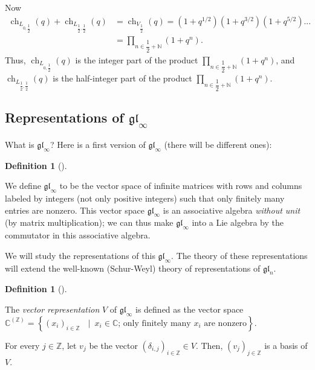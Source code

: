 \documentclass
[numbers=enddot,12pt,final,onecolumn,german,notitlepage]{scrartcl}%
\theoremstyle{definition}
\newtheorem{defi}[theo]{Definition}
\newenvironment{definition}[1][]
{\begin{defi}[#1]\begin{leftbar}}
{\end{leftbar}\end{defi}}
\begin{document}
Now%
\begin{align*}
\operatorname*{ch}\nolimits_{L_{0,\dfrac{1}{2}}}\left(  q\right)
+\operatorname*{ch}\nolimits_{L_{\dfrac{1}{2},\dfrac{1}{2}}}\left(  q\right)
&  =\operatorname*{ch}\nolimits_{V_{\dfrac{1}{2}}}\left(  q\right)  =\left(
1+q^{1/2}\right)  \left(  1+q^{3/2}\right)  \left(  1+q^{5/2}\right)  ...\\
&  =\prod\limits_{n\in\dfrac{1}{2}+\mathbb{N}}\left(  1+q^{n}\right)  .
\end{align*}
Thus, $\operatorname*{ch}\nolimits_{L_{0,\dfrac{1}{2}}}\left(  q\right)  $ is
the integer part of the product $\prod\limits_{n\in\dfrac{1}{2}+\mathbb{N}%
}\left(  1+q^{n}\right)  $, and $\operatorname*{ch}\nolimits_{L_{\dfrac{1}%
{2},\dfrac{1}{2}}}\left(  q\right)  $ is the half-integer part of the product
$\prod\limits_{n\in\dfrac{1}{2}+\mathbb{N}}\left(  1+q^{n}\right)  $.

\subsection{Representations of $\mathfrak{gl}_{\infty}$}

What is $\mathfrak{gl}_{\infty}$? Here is a first version of $\mathfrak{gl}%
_{\infty}$ (there will be different ones):

\begin{definition}
We define $\mathfrak{gl}_{\infty}$ to be the vector space of infinite matrices
with rows and columns labeled by integers (not only positive integers) such
that only finitely many entries are nonzero. This vector space $\mathfrak{gl}%
_{\infty}$ is an associative algebra \textit{without unit} (by matrix
multiplication); we can thus make $\mathfrak{gl}_{\infty}$ into a Lie algebra
by the commutator in this associative algebra.
\end{definition}

We will study the representations of this $\mathfrak{gl}_{\infty}$. The theory
of these representations will extend the well-known (Schur-Weyl) theory of
representations of $\mathfrak{gl}_{n}$.

\begin{definition}
The \textit{vector representation} $V$ of $\mathfrak{gl}_{\infty}$ is defined
as the vector space $\mathbb{C}^{\left(  \mathbb{Z}\right)  }=\left\{  \left(
x_{i}\right)  _{i\in\mathbb{Z}}\text{\ }\mid\ x_{i}\in\mathbb{C}\text{; only
finitely many }x_{i}\text{ are nonzero}\right\}  $.

For every $j\in\mathbb{Z}$, let $v_{j}$ be the vector $\left(  \delta
_{i,j}\right)  _{i\in\mathbb{Z}}\in V$. Then, $\left(  v_{j}\right)
_{j\in\mathbb{Z}}$ is a basis of $V$.
\end{definition}
\end{document}
